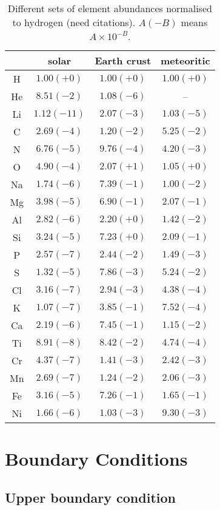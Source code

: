 \documentclass[11pt]{article}
\begin{document}
\begin{table}
\centering
\caption{Different sets of element abundances normalised to hydrogen
  (need citations). $A(-B)$ means $A\times 10^{-B}$.}
\label{tab:eps}
\vspace*{2mm}
\begin{tabular}{cccc}
\hline
     &     solar & Earth crust & meteoritic \\
\hline
 H   & $1.00(+0)$ &   $1.00(+0)$ &   $1.00(+0)$ \\
 He  & $8.51(-2)$ &   $1.08(-6)$ &   -- \\
 Li  & $1.12(-11)$ &  $2.07(-3)$ &   $1.03(-5)$ \\
 C   & $2.69(-4)$ &   $1.20(-2)$ &   $5.25(-2)$ \\
 N   & $6.76(-5)$ &   $9.76(-4)$ &   $4.20(-3)$ \\
 O   & $4.90(-4)$ &   $2.07(+1)$ &   $1.05(+0)$ \\
 Na  & $1.74(-6)$ &   $7.39(-1)$ &   $1.00(-2)$ \\
 Mg  & $3.98(-5)$ &   $6.90(-1)$ &   $2.07(-1)$ \\
 Al  & $2.82(-6)$ &   $2.20(+0)$ &   $1.42(-2)$ \\
 Si  & $3.24(-5)$ &   $7.23(+0)$ &   $2.09(-1)$ \\
 P   & $2.57(-7)$ &   $2.44(-2)$ &   $1.49(-3)$ \\
 S   & $1.32(-5)$ &   $7.86(-3)$ &   $5.24(-2)$ \\
 Cl  & $3.16(-7)$ &   $2.94(-3)$ &   $4.38(-4)$ \\
 K   & $1.07(-7)$ &   $3.85(-1)$ &   $7.52(-4)$ \\
 Ca  & $2.19(-6)$ &   $7.45(-1)$ &   $1.15(-2)$ \\
 Ti  & $8.91(-8)$ &   $8.42(-2)$ &   $4.74(-4)$ \\
 Cr  & $4.37(-7)$ &   $1.41(-3)$ &   $2.42(-3)$ \\
 Mn  & $2.69(-7)$ &   $1.24(-2)$ &   $2.06(-3)$ \\
 Fe  & $3.16(-5)$ &   $7.26(-1)$ &   $1.65(-1)$ \\
 Ni  & $1.66(-6)$ &   $1.03(-3)$ &   $9.30(-3)$ \\
\hline
\end{tabular}
\end{table}


\section{Boundary Conditions}
\subsection{Upper boundary condition}
\label{UpperBound}
\end{document}
